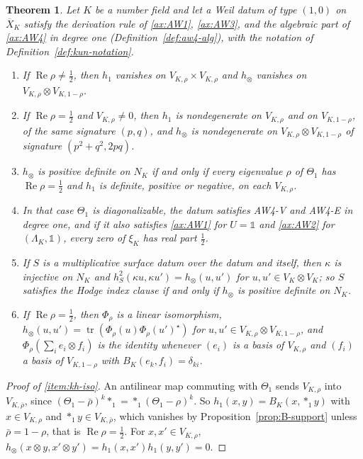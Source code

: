 \documentclass[11pt]{amsart}
\theoremstyle{plain}
\newtheorem{theorem}{Theorem}[section]
\theoremstyle{definition}
\theoremstyle{remark}
\numberwithin{equation}{section}
\newcommand{\Xbar}{\overline{X}}
\DeclareMathOperator{\tr}{tr}
\DeclareMathOperator{\Rea}{Re}
\renewcommand{\Re}{\Rea}
\begin{document}
\begin{theorem}\label{thm:kun-hodge}
Let $K$ be a number field and let a Weil datum of type $(1,0)$ on
$\Xbar_K$ satisfy the derivation rule of \ref{ax:AW1}, \ref{ax:AW3}, and
the algebraic part of \ref{ax:AW4} in degree one
(Definition~\ref{def:aw4-alg}), with the notation of
Definition~\ref{def:kun-notation}.
\begin{enumerate}[label=(\roman*)]
\item\label{item:kh-iso} If $\Re\rho\ne\tfrac12$, then $h_1$ vanishes
  on $V_{K,\rho}\times V_{K,\rho}$ and $h_\otimes$ vanishes on
  $V_{K,\rho}\otimes V_{K,1-\rho}$.
\item\label{item:kh-sign} If $\Re\rho=\tfrac12$ and $V_{K,\rho}\ne0$,
  then $h_1$ is nondegenerate on $V_{K,\rho}$ and on $V_{K,1-\rho}$, of
  the same signature $(p,q)$, and $h_\otimes$ is nondegenerate on
  $V_{K,\rho}\otimes V_{K,1-\rho}$ of signature $(p^2+q^2,2pq)$.
\item\label{item:kh-iff} $h_\otimes$ is positive definite on $N_K$ if
  and only if every eigenvalue $\rho$ of $\Theta_1$ has
  $\Re\rho=\tfrac12$ and $h_1$ is definite, positive or negative, on
  each $V_{K,\rho}$.
\item\label{item:kh-pure} In that case $\Theta_1$ is diagonalizable,
  the datum satisfies AW4-V and AW4-E in degree one, and if it also
  satisfies \ref{ax:AW1} for $U=\mathbb 1$ and \ref{ax:AW2} for
  $(\Lambda_K,\mathbb 1)$, every zero of $\xi_K$ has real part
  $\tfrac12$.
\item\label{item:kh-surface} If $S$ is a multiplicative surface datum
  over the datum and itself, then $\kappa$ is injective on $N_K$ and
  $h_S^2(\kappa u,\kappa u')=h_\otimes(u,u')$ for $u,u'\in V_K\otimes
  V_K$; so $S$ satisfies the Hodge index clause if and only if
  $h_\otimes$ is positive definite on $N_K$.
\item\label{item:kh-rosati} If $\Re\rho=\tfrac12$, then $\Phi_\rho$ is a
  linear isomorphism, $h_\otimes(u,u')=\tr(\Phi_\rho(u)
  \Phi_\rho(u')^\star)$ for $u,u'\in V_{K,\rho}\otimes V_{K,1-\rho}$, and
  $\Phi_\rho(\sum_ie_i\otimes f_i)$ is the identity whenever
  $(e_i)$ is a basis of $V_{K,\rho}$ and $(f_i)$ a basis of
  $V_{K,1-\rho}$ with $B_K(e_k,f_i)=\delta_{ki}$.
\end{enumerate}
\end{theorem}

\begin{proof}[Proof of \ref{item:kh-iso}]
An antilinear map commuting with $\Theta_1$ sends $V_{K,\rho}$ into
$V_{K,\bar\rho}$, since $(\Theta_1-\bar\rho)^k*_1=
*_1(\Theta_1-\rho)^k$. So $h_1(x,y)=B_K(x,*_1y)$ with
$x\in V_{K,\rho}$ and $*_1y\in V_{K,\bar\rho}$, which vanishes by
Proposition~\ref{prop:B-support} unless $\bar\rho=1-\rho$, that is
$\Re\rho=\tfrac12$. For $x,x'\in V_{K,\rho}$,
$h_\otimes(x\otimes y,x'\otimes y')=h_1(x,x')h_1(y,y')=0$.
\end{proof}
\end{document}
